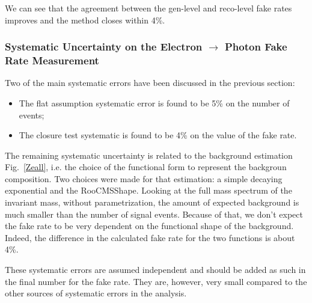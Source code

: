 
We can see that the agreement between the gen-level and reco-level fake rates improves and the method closes within 4\%.

\subsubsection{Systematic Uncertainty on the Electron $\rightarrow$ Photon Fake Rate Measurement}
Two of the main systematic errors have been discussed in the previous section:

\begin{itemize}
\item The flat assumption systematic error is found to be 5\% on the number of events;
\item The closure test systematic is found to be 4\% on the value of the fake rate.
\end{itemize}

The remaining systematic uncertainty is related to the background estimation Fig.~\ref{Zeall}, i.e. the choice of the functional form to represent the backgroun composition. Two choices were made for that estimation: a simple decaying exponential and the RooCMSShape. Looking at the full mass spectrum of the invariant mass, without parametrization, the amount of expected background is much smaller than the number of signal events. Because of that, we don't expect the fake rate to be very dependent on the functional shape of the background. Indeed, the difference in the calculated fake rate for the two functions is about 4\%.

These systematic errors are assumed independent and should be added as such in the final number for the fake rate. They are, however, very small compared to the other sources of systematic errors in the analysis.

